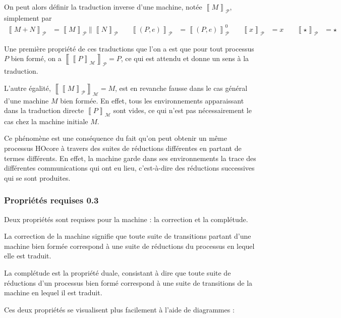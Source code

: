 \documentclass[11pt]{article}
\newcommand{\machine}[1]{\left\llbracket{#1}\right\rrbracket_{\mathcal{M}}}
\newcommand{\process}[1]{\left\llbracket{#1}\right\rrbracket_{\mathcal{P}}}
\newcounter{c_theo}
\newcounter{c_def}
\begin{document}
On peut alors définir la traduction inverse d'une machine, notée $\process{M}$, simplement par
\begin{align*}
\process{M+N} &= \process{M} \parallel \process{N}
&\quad \process{(P,e)} &= \process{(P,e)}^0
&\quad\process{x} &= x &\quad \process{\star} &= \star
\end{align*}

Une première propriété de ces traductions que l'on a est que pour tout processus $P$ bien formé, on a $\process{\machine{P}} = P$, ce qui est attendu et donne un sens à la traduction.

L'autre égalité, $\machine{\process{M}} = M$, est en revanche fausse dans le cas général d'une machine $M$ bien formée. En effet, tous les environnements apparaissant dans la traduction directe $\machine{P}$ sont vides, ce qui n'est pas nécessairement le cas chez la machine initiale $M$.

Ce phénomène est une conséquence du fait qu'on peut obtenir un même processus HOcore à travers des suites de réductions différentes en partant de termes différents. En effet, la machine garde dans ses environnements la trace des différentes communications qui ont eu lieu, c'est-à-dire des réductions successives qui se sont produites.

\subsubsection{Propriétés requises 0.3}
\label{sec-3-2-2}

Deux propriétés sont requises pour la machine : la correction et la complétude.

La correction de la machine signifie que toute suite de transitions partant d'une machine bien formée correspond à une suite de réductions du processus en lequel elle est traduit.

La complétude est la propriété duale, consistant à dire que toute suite de réductions d'un processus bien formé correspond à une suite de transitions de la machine en lequel il est traduit.

Ces deux propriétés se visualisent plus facilement à l'aide de diagrammes :\\
\end{document}
